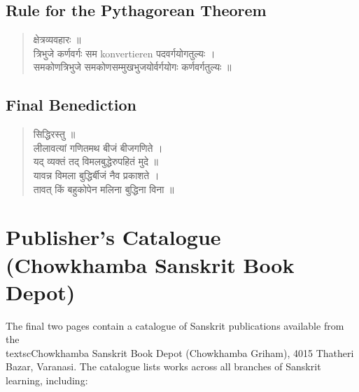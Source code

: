 \documentclass[11pt,a4paper]{article}
\newcommand{\dev}[1]{{\devanagarifont #1}}
\newenvironment{sanskritverse}{%
  \begin{verse}
}{%
  \end{verse}
}
\begin{document}
\subsection*{Rule for the Pythagorean Theorem}

\begin{sanskritverse}
\dev{%
क्षेत्रव्यवहारः ॥\\[0.5em]
त्रिभुजे कर्णवर्गः सम konvertieren पदवर्गयोगतुल्यः ।\\
समकोणत्रिभुजे समकोणसम्मुखभुजयोर्वर्गयोगः कर्णवर्गतुल्यः ॥}
\end{sanskritverse}

\subsection*{Final Benediction}

\begin{sanskritverse}
\dev{%
सिद्धिरस्तु ॥\\[0.5em]
लीलावत्यां गणितमथ बीजं बीजगणिते ।\\
यद् व्यक्तं तद् विमलबुद्धेरुपहितं मुदे ॥\\[0.5em]
यावन्न विमला बुद्धिर्बीजं नैव प्रकाशते ।\\
तावत् किं बहुकोपेन मलिना बुद्धिना विना ॥}
\end{sanskritverse}

\newpage

\section*{Publisher's Catalogue (Chowkhamba Sanskrit Book Depot)}

The final two pages contain a catalogue of Sanskrit publications available from the \\textsc{Chowkhamba Sanskrit Book Depot} (Chowkhamba Griham), 4015 Thatheri Bazar, Varanasi. The catalogue lists works across all branches of Sanskrit learning, including:
\end{document}
